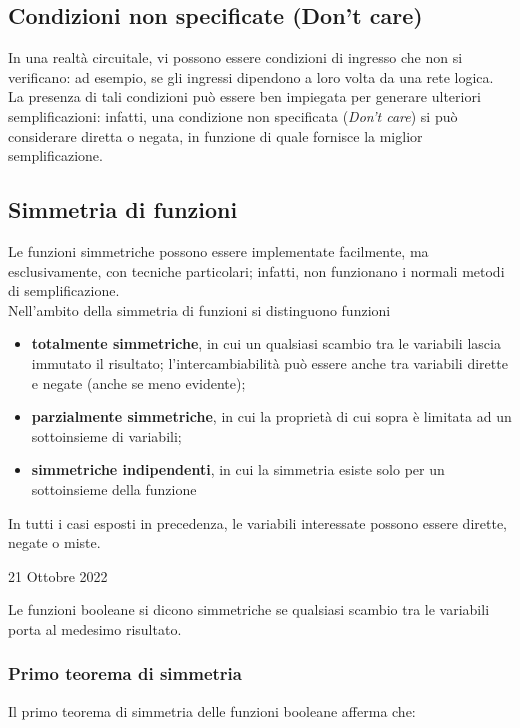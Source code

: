\documentclass[a4paper]{extarticle}
\begin{document}
\vspace{1em}
\noindent
\subsection{Condizioni non specificate (Don't care)}
In una realtà circuitale, vi possono essere condizioni di ingresso che non si verificano: ad esempio, se gli ingressi dipendono a loro volta da una rete logica.\\
La presenza di tali condizioni può essere ben impiegata per generare ulteriori semplificazioni: infatti, una condizione non specificata (\textit{Don't care}) si può considerare diretta o negata, in funzione di quale fornisce la miglior semplificazione.

\vspace{1em}
\noindent
\subsection{Simmetria di funzioni}
Le funzioni simmetriche possono essere implementate facilmente, ma esclusivamente, con tecniche particolari; infatti, non funzionano i normali metodi di semplificazione.\\
Nell'ambito della simmetria di funzioni si distinguono funzioni
\begin{itemize}
    \item \textbf{totalmente simmetriche}, in cui un qualsiasi scambio tra le variabili lascia immutato il risultato; l'intercambiabilità può essere anche tra variabili dirette e negate (anche se meno evidente);
    \item \textbf{parzialmente simmetriche}, in cui la proprietà di cui sopra è limitata ad un sottoinsieme di variabili;
    \item \textbf{simmetriche indipendenti}, in cui la simmetria esiste solo per un sottoinsieme della funzione
\end{itemize}
In tutti i casi esposti in precedenza, le variabili interessate possono essere dirette, negate o miste.

\newpage
\begin{center} 
    21 Ottobre 2022
\end{center}
Le funzioni booleane si dicono simmetriche se qualsiasi scambio tra le variabili porta al medesimo risultato.

\vspace{1em}
\noindent
\subsubsection{Primo teorema di simmetria}
Il primo teorema di simmetria delle funzioni booleane afferma che:
\end{document}
